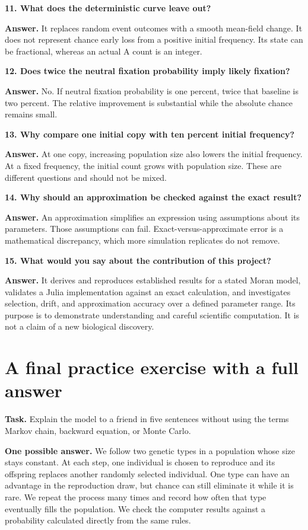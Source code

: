 \begin{checkpoint}
\textbf{11. What does the deterministic curve leave out?}

\textbf{Answer.} It replaces random event outcomes with a smooth mean-field
change. It does not represent chance early loss from a positive initial
frequency. Its state can be fractional, whereas an actual A count is an
integer.

\textbf{12. Does twice the neutral fixation probability imply likely fixation?}

\textbf{Answer.} No. If neutral fixation probability is one percent, twice
that baseline is two percent. The relative improvement is substantial while
the absolute chance remains small.

\textbf{13. Why compare one initial copy with ten percent initial frequency?}

\textbf{Answer.} At one copy, increasing population size also lowers the
initial frequency. At a fixed frequency, the initial count grows with
population size. These are different questions and should not be mixed.

\textbf{14. Why should an approximation be checked against the exact result?}

\textbf{Answer.} An approximation simplifies an expression using assumptions
about its parameters. Those assumptions can fail. Exact-versus-approximate
error is a mathematical discrepancy, which more simulation replicates do
not remove.

\textbf{15. What would you say about the contribution of this project?}

\textbf{Answer.} It derives and reproduces established results for a stated
Moran model, validates a Julia implementation against an exact calculation,
and investigates selection, drift, and approximation accuracy over a defined
parameter range. Its purpose is to demonstrate understanding and careful
scientific computation. It is not a claim of a new biological discovery.
\end{checkpoint}

\section{A final practice exercise with a full answer}

\textbf{Task.} Explain the model to a friend in five sentences without using
the terms Markov chain, backward equation, or Monte Carlo.

\textbf{One possible answer.} We follow two genetic types in a population
whose size stays constant. At each step, one individual is chosen to
reproduce and its offspring replaces another randomly selected individual.
One type can have an advantage in the reproduction draw, but chance can
still eliminate it while it is rare. We repeat the process many times and
record how often that type eventually fills the population. We check the
computer results against a probability calculated directly from the same
rules.

